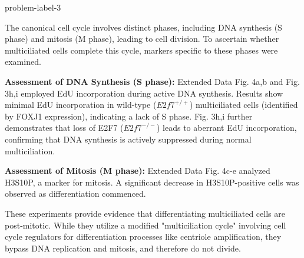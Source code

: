 \begin{problem}{}{problem-label-3}

The canonical cell cycle involves distinct phases, including DNA synthesis (S phase) and mitosis (M phase), leading to cell division. To ascertain whether multiciliated cells complete this cycle, markers specific to these phases were examined.

 \textbf{Assessment of DNA Synthesis (S phase):} Extended Data Fig. 4a,b and Fig. 3h,i employed EdU incorporation during active DNA synthesis. Results show minimal EdU incorporation in wild-type ($E2f7^{+/+}$) multiciliated cells (identified by FOXJ1 expression), indicating a lack of S phase. Fig. 3h,i further demonstrates that loss of E2F7 ($E2f7^{-/-}$) leads to aberrant EdU incorporation, confirming that DNA synthesis is actively suppressed during normal multiciliation.

 \textbf{Assessment of Mitosis (M phase):} Extended Data Fig. 4c-e analyzed H3S10P, a marker for mitosis. A significant decrease in H3S10P-positive cells was observed as differentiation commenced.

These experiments provide evidence that differentiating multiciliated cells are post-mitotic. While they utilize a modified "multiciliation cycle" involving cell cycle regulators for differentiation processes like centriole amplification, they bypass DNA replication and mitosis, and therefore do not divide.

\end{problem}


























